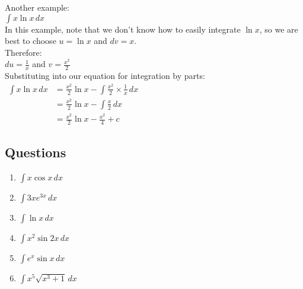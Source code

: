 \documentclass[../main.tex]{subfiles}
\begin{document}
Another example:\\
\(\int x \ln{x} \,dx\)\\

In this example, note that we don't know how to easily integrate \(\ln{x}\), so we are best to choose \(u=\ln{x}\) and \(dv=x\).\\

Therefore:\\
\(du=\frac{1}{x}\) and \(v=\frac{x^2}{2}\)\\

Substituting into our equation for integration by parts:\\
$
\!
\begin{aligned}
    \int x\ln{x}\, dx
    &= \frac{x^2}{2}\ln{x}-\int \frac{x^2}{2}\times \frac{1}{x}\, dx\\
    &=\frac{x^2}{2}\ln{x}-\int \frac{x}{2}\, dx\\
    &=\frac{x^2}{2}\ln{x}-\frac{x^2}{4}+c
\end{aligned}
$

\pagebreak

\subsection*{Questions}
\label{Integration by parts}

\begin{enumerate}
    \item \(\int x\cos{x} \, dx\)\\

    \item \(\int 3xe^{3x}\, dx\)\\

    \item \(\int \ln{x}\, dx\)\\

    \item \(\int x^2 \sin{2x} \, dx\)\\

    \item \(\int e^x \sin{x}\, dx\)\\

    \item \(\int x^5 \sqrt{x^3+1}\, dx\)
    
    
\end{enumerate}


\pagebreak
\end{document}
